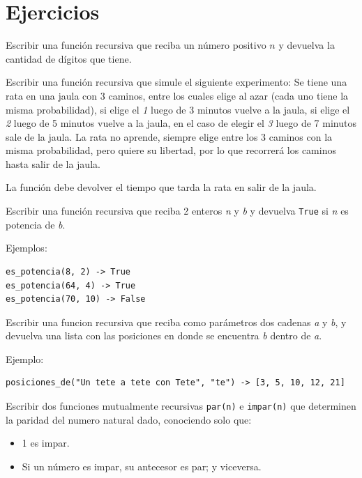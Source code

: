 \newpage
\section{Ejercicios}

\begin{ejercicio}
Escribir una función recursiva que reciba un número positivo $n$ y devuelva
la cantidad de dígitos que tiene.
\end{ejercicio}

\begin{ejercicio}
Escribir una función recursiva que simule el siguiente experimento:
Se tiene una rata en una jaula con 3 caminos, entre los cuales elige
al azar (cada uno tiene la misma probabilidad), si elige el \emph{1} luego
de 3 minutos vuelve a la jaula, si elige el \emph{2} luego de 5 minutos vuelve a
la jaula, en el caso de elegir el \emph{3} luego de 7 minutos sale de la jaula.
La rata no aprende, siempre elige entre los 3 caminos con la misma probabilidad,
pero quiere su libertad, por lo que recorrerá los caminos hasta salir de la jaula.

La función debe devolver el tiempo que tarda la rata en salir de la jaula.
\end{ejercicio}

\begin{ejercicio}
Escribir una función recursiva que reciba 2 enteros \emph{n} y \emph{b} y devuelva
\verb!True! si \emph{n} es potencia de \emph{b}.

Ejemplos:
\begin{verbatim}
es_potencia(8, 2) -> True
es_potencia(64, 4) -> True
es_potencia(70, 10) -> False
\end{verbatim}
\end{ejercicio}

\begin{ejercicio}
Escribir una funcion recursiva que reciba como parámetros dos cadenas \emph{a} y
\emph{b}, y devuelva una lista con las posiciones en donde se encuentra \emph{b}
dentro de \emph{a}.

Ejemplo:
\begin{verbatim}
posiciones_de("Un tete a tete con Tete", "te") -> [3, 5, 10, 12, 21]
\end{verbatim}
\end{ejercicio}

\begin{ejercicio}
Escribir dos funciones mutualmente recursivas \verb|par(n)| e \verb|impar(n)| que
determinen la paridad del numero natural dado, conociendo solo que:
\begin{itemize}
    \item 1 es impar.
    \item Si un número es impar, su antecesor es par; y viceversa.
\end{itemize}
\end{ejercicio}

